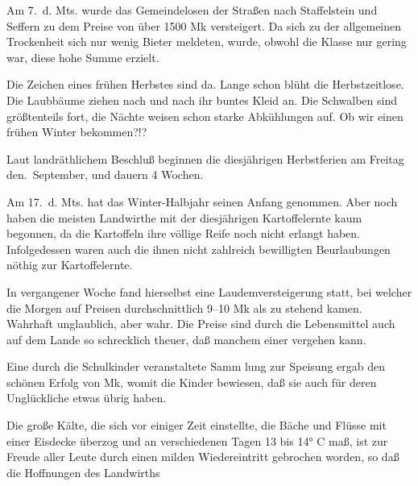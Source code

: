

%
Am 7.\ d. Mts. wurde das Gemeindelosen der\ob
Straßen nach Staffelstein und Seffern zu dem\ob
Preise von über 1500 Mk versteigert. Da sich\ob
zu der allgemeinen Trockenheit sich nur wenig\ob
Bieter meldeten, wurde, obwohl die Klasse nur\ob
gering war, diese hohe Summe erzielt.

Die Zeichen eines frühen Herbstes sind da.\ob
Lange schon blüht die Herbstzeitlose. Die Laubbäume\ob
ziehen nach und nach ihr buntes Kleid an. Die Schwalben\ob
sind größtenteils fort, die Nächte weisen schon starke\ob
Abkühlungen auf. Ob wir einen frühen Winter\ob
bekommen?!?

Laut landräthlichem Beschluß beginnen\ob
die diesjährigen Herbstferien am Freitag den.\ September, und dauern 4 Wochen.

%
Am 17.\ d. Mts. hat das Winter-Halbjahr seinen\ob
Anfang genommen. Aber noch haben die meisten\ob
Landwirthe mit der diesjährigen Kartoffelernte\ob
kaum begonnen, da die Kartoffeln ihre völlige\ob
Reife noch nicht erlangt haben. Infolgedessen waren\ob
auch die ihnen nicht zahlreich bewilligten Beurlaubungen\ob
nöthig zur Kartoffelernte.

%
In vergangener Woche fand hierselbst eine\ob
Laudemversteigerung statt, bei welcher die Morgen\ob
auf Preisen durchschnittlich 9--10 Mk als zu stehend\ob
kamen. Wahrhaft unglaublich, aber wahr. Die Preise\ob
sind durch die Lebensmittel auch auf dem Lande so\ob
schrecklich theuer, daß manchem einer vergehen kann.

Eine durch die Schulkinder veranstaltete Samm\ohb
lung zur Speisung ergab den schönen Erfolg von Mk, womit die Kinder bewiesen, daß sie auch\ob
für deren Unglückliche etwas übrig haben.

%
Die große Kälte, die sich vor einiger Zeit einstellte,\ob
die Bäche und Flüsse mit einer Eisdecke überzog und\ob
an verschiedenen Tagen 13 bis 14° C maß, ist zur\ob
Freude aller Leute durch einen milden Wiedereintritt\ob
gebrochen worden, so daß die Hoffnungen des Landwirths
\pend
